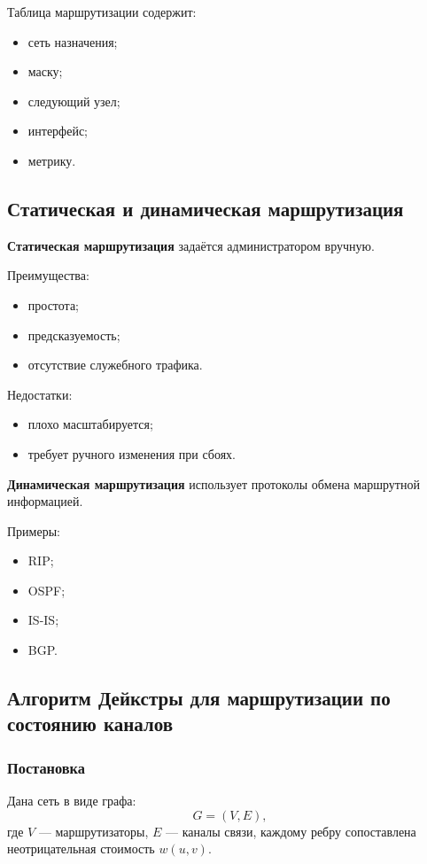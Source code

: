 \documentclass[12pt,a4paper]{article}
\begin{document}
Таблица маршрутизации содержит:
\begin{itemize}
    \item сеть назначения;
    \item маску;
    \item следующий узел;
    \item интерфейс;
    \item метрику.
\end{itemize}

\subsection{Статическая и динамическая маршрутизация}

\textbf{Статическая маршрутизация} задаётся администратором вручную.

Преимущества:
\begin{itemize}
    \item простота;
    \item предсказуемость;
    \item отсутствие служебного трафика.
\end{itemize}

Недостатки:
\begin{itemize}
    \item плохо масштабируется;
    \item требует ручного изменения при сбоях.
\end{itemize}

\textbf{Динамическая маршрутизация} использует протоколы обмена маршрутной информацией.

Примеры:
\begin{itemize}
    \item RIP;
    \item OSPF;
    \item IS-IS;
    \item BGP.
\end{itemize}

\subsection{Алгоритм Дейкстры для маршрутизации по состоянию каналов}

\subsubsection{Постановка}

Дана сеть в виде графа:
\[
G=(V,E),
\]
где $V$ --- маршрутизаторы, $E$ --- каналы связи, каждому ребру сопоставлена неотрицательная стоимость $w(u,v)$.
\end{document}
